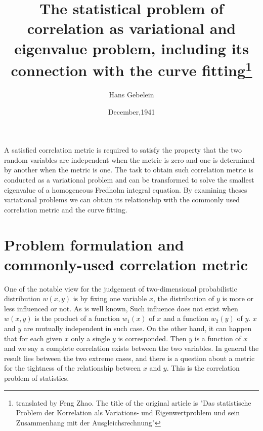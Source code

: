 \documentclass{article}
\title{The statistical problem of correlation as variational and eigenvalue problem, including its connection with the curve fitting\footnote{translated by Feng Zhao. The title of the original article is "Das statistische Problem der Korrelation als Variations- und Eigenwertproblem und sein Zusammenhang mit der Ausgleichsrechnung"}}
\date{December,1941}
\author{Hans Gebelein}
\begin{document}
\maketitle
\begin{centering}
A satisfied correlation metric is required to satisfy
the property that the two random variables are independent when the metric is zero and one is
determined by another when the metric is one.
The task to obtain such correlation metric is conducted
as a variational problem and can be transformed to solve
the smallest eigenvalue of a homogeneous Fredholm integral equation. By examining theses variational
problems we can obtain its relationship with the commonly used correlation metric and the curve fitting.
\end{centering}

\section{Problem formulation and commonly-used correlation metric}
One of the notable view for the judgement of two-dimensional probabilistic distribution $w(x,y)$ is by fixing one variable $x$, the distribution of $y$ is more or less influenced or not. As is well known,
Such influence does not exist when $w(x,y)$
is the product of a function $w_1(x)$ of $x$ and
a function $w_2(y)$ of $y$. $x$ and $y$
are mutually independent in such case. On the
other hand, it can happen that for each given $x$
only a single $y$ is corresponded. Then $y$
is a function of $x$ and we say a complete correlation
exists between the two variables. In general the result lies between the two extreme cases, and there is a question about a metric for the tightness of the relationship
between $x$ and $y$. This is the correlation problem of statistics.
\end{document}
